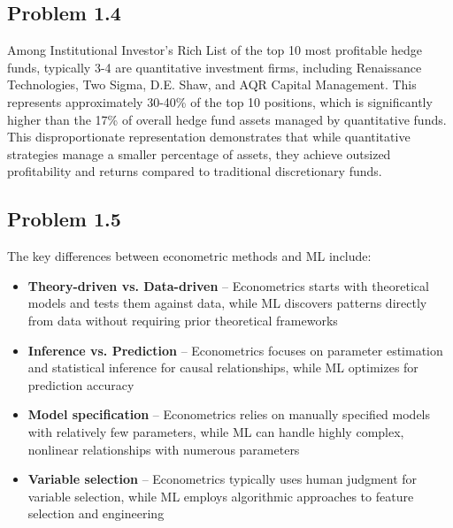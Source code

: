 \documentclass{article}
\begin{document}
\begin{sloppypar}
\subsection{Problem 1.4}

Among Institutional Investor's Rich List of the top 10 most profitable hedge funds, typically 3-4 are quantitative investment firms, including Renaissance Technologies, Two Sigma, D.E. Shaw, and AQR Capital Management. This represents approximately 30-40\% of the top 10 positions, which is significantly higher than the 17\% of overall hedge fund assets managed by quantitative funds. This disproportionate representation demonstrates that while quantitative strategies manage a smaller percentage of assets, they achieve outsized profitability and returns compared to traditional discretionary funds.

\subsection{Problem 1.5}
The key differences between econometric methods and ML include:

\begin{itemize}
    \item \textbf{Theory-driven vs. Data-driven} -- Econometrics starts with theoretical models and tests them against data, while ML discovers patterns directly from data without requiring prior theoretical frameworks
    
    \item \textbf{Inference vs. Prediction} -- Econometrics focuses on parameter estimation and statistical inference for causal relationships, while ML optimizes for prediction accuracy
    
    \item \textbf{Model specification} -- Econometrics relies on manually specified models with relatively few parameters, while ML can handle highly complex, nonlinear relationships with numerous parameters
    
    \item \textbf{Variable selection} -- Econometrics typically uses human judgment for variable selection, while ML employs algorithmic approaches to feature selection and engineering
\end{itemize}


\end{sloppypar}
\end{document}

